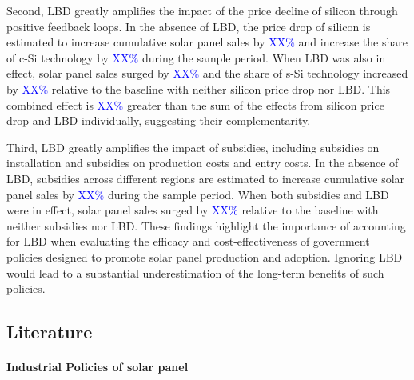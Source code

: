 \documentclass[12pt, letter]{article}
\begin{document}
Second, LBD greatly amplifies the impact of the price decline of silicon through positive feedback loops. In the absence of LBD, the price drop of silicon is estimated to increase cumulative solar panel sales by \textcolor{blue}{XX\%} and increase the share of c-Si technology by \textcolor{blue}{XX\%} during the sample period. When LBD was also in effect, solar panel sales surged by \textcolor{blue}{XX\%} and the share of s-Si technology increased by \textcolor{blue}{XX\%} relative to the baseline with neither silicon price drop nor LBD. This combined effect is \textcolor{blue}{XX\%} greater than the sum of the effects from silicon price drop and LBD individually, suggesting their complementarity. 


Third, LBD greatly amplifies the impact of subsidies, including subsidies on installation and subsidies on production costs and entry costs. In the absence of LBD, subsidies across different regions are estimated to increase cumulative solar panel sales by \textcolor{blue}{XX\%} during the sample period. When both subsidies and LBD were in effect, solar panel sales surged by \textcolor{blue}{XX\%} relative to the baseline with neither subsidies nor LBD.  These findings highlight the importance of accounting for LBD when evaluating the efficacy and cost-effectiveness of government policies designed to promote solar panel production and adoption. Ignoring LBD would lead to a substantial underestimation of the long-term benefits of such policies.



\subsection*{Literature}

\paragraph{Industrial Policies of solar panel}
\end{document}
